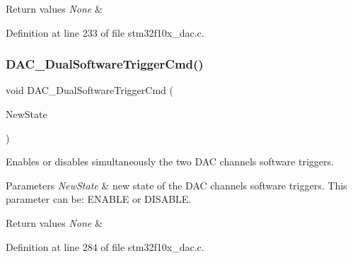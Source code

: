 \begin{DoxyRetVals}{Return values}
{\em None} & \\
\hline
\end{DoxyRetVals}


Definition at line 233 of file stm32f10x\+\_\+dac.\+c.

\mbox{\label{group___d_a_c___private___functions_gab4d3b364a6b184dcd65f3b294ebf56dc}} 
\subsubsection{\texorpdfstring{D\+A\+C\+\_\+\+Dual\+Software\+Trigger\+Cmd()}{DAC\_DualSoftwareTriggerCmd()}}
{\footnotesize\ttfamily void D\+A\+C\+\_\+\+Dual\+Software\+Trigger\+Cmd (\begin{DoxyParamCaption}\item[{\hyperlink{group___exported__types_gac9a7e9a35d2513ec15c3b537aaa4fba1}{Functional\+State}}]{New\+State }\end{DoxyParamCaption})}



Enables or disables simultaneously the two D\+AC channels software triggers. 


\begin{DoxyParams}{Parameters}
{\em New\+State} & new state of the D\+AC channels software triggers. This parameter can be\+: E\+N\+A\+B\+LE or D\+I\+S\+A\+B\+LE. \\
\hline
\end{DoxyParams}

\begin{DoxyRetVals}{Return values}
{\em None} & \\
\hline
\end{DoxyRetVals}


Definition at line 284 of file stm32f10x\+\_\+dac.\+c.

\mbox{\label{group___d_a_c___private___functions_ga51274838de1e5dd012a82d7f44d7a50b}} 
